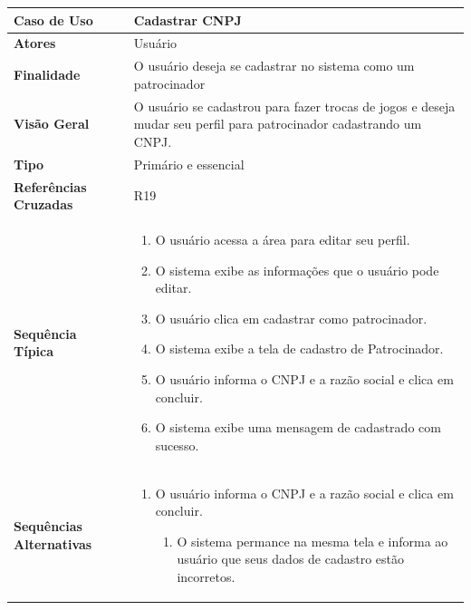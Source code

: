 \documentclass[a4paper,11pt]{article}
\begin{document}
\begin{table}[H]
		\begin{tabularx}{\textwidth}{|l|X|}
		\hline
			\textbf{Caso de Uso} &  Cadastrar CNPJ \\ \hline
			\textbf{Atores} &  Usuário  \\ \hline
			\textbf{Finalidade} & O usuário deseja se cadastrar no sistema como um patrocinador  \\ \hline
			\textbf{Visão Geral} & O usuário se cadastrou para fazer trocas de jogos e deseja mudar seu perfil para patrocinador cadastrando um CNPJ. \\ \hline
			\textbf{Tipo} & Primário e essencial  \\ \hline
			\textbf{Referências Cruzadas} &  R19 \\ \hline
			\textbf{Sequência Típica} & 
			
			\begin{enumerate}
			\item O usuário acessa a área para editar seu perfil.
			\item O sistema exibe as informações que o usuário pode editar.
			\item O usuário clica em cadastrar como patrocinador.
			\item O sistema exibe a tela de cadastro de Patrocinador.
			\item O usuário informa o CNPJ e a razão social e clica em concluir.
			\item O sistema exibe uma mensagem de cadastrado com sucesso.
			\end{enumerate} \\ \hline
			
			\textbf{Sequências Alternativas} & 
			\begin{enumerate}
			\item O usuário informa o CNPJ e a razão social e clica em concluir.
			\begin{enumerate}
			\item O sistema permance na mesma tela e informa ao usuário que seus dados de cadastro estão incorretos.
			\end{enumerate}
			
			\end{enumerate} \\ \hline
		\end{tabularx}
\end{table}
\end{document}
